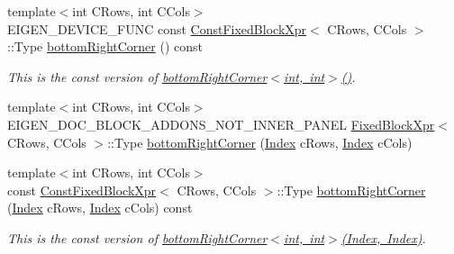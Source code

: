 \begin{DoxyCompactItemize}
{\footnotesize template$<$int C\+Rows, int C\+Cols$>$ }\\E\+I\+G\+E\+N\+\_\+\+D\+E\+V\+I\+C\+E\+\_\+\+F\+U\+NC const \mbox{\hyperlink{struct_eigen_1_1_sparse_matrix_base_1_1_const_fixed_block_xpr}{Const\+Fixed\+Block\+Xpr}}$<$ C\+Rows, C\+Cols $>$\+::Type \mbox{\hyperlink{class_eigen_1_1_sparse_matrix_base_ad511aa3f5b977089238bf0903f8f2267}{bottom\+Right\+Corner}} () const
\begin{DoxyCompactList}\small\item\em This is the const version of \mbox{\hyperlink{class_eigen_1_1_sparse_matrix_base_a3f810c062c1bc3cad4ae82be15c15636}{bottom\+Right\+Corner$<$int, int$>$()}}. \end{DoxyCompactList}\item 
{\footnotesize template$<$int C\+Rows, int C\+Cols$>$ }\\E\+I\+G\+E\+N\+\_\+\+D\+O\+C\+\_\+\+B\+L\+O\+C\+K\+\_\+\+A\+D\+D\+O\+N\+S\+\_\+\+N\+O\+T\+\_\+\+I\+N\+N\+E\+R\+\_\+\+P\+A\+N\+EL \mbox{\hyperlink{struct_eigen_1_1_sparse_matrix_base_1_1_fixed_block_xpr}{Fixed\+Block\+Xpr}}$<$ C\+Rows, C\+Cols $>$\+::Type \mbox{\hyperlink{class_eigen_1_1_sparse_matrix_base_a68d2c2489e2f434ad062384eb224ea85}{bottom\+Right\+Corner}} (\mbox{\hyperlink{struct_eigen_1_1_eigen_base_a554f30542cc2316add4b1ea0a492ff02}{Index}} c\+Rows, \mbox{\hyperlink{struct_eigen_1_1_eigen_base_a554f30542cc2316add4b1ea0a492ff02}{Index}} c\+Cols)
\item 
\mbox{\label{class_eigen_1_1_sparse_matrix_base_a752c59896582b0c654d24362f3799b68}} 
{\footnotesize template$<$int C\+Rows, int C\+Cols$>$ }\\const \mbox{\hyperlink{struct_eigen_1_1_sparse_matrix_base_1_1_const_fixed_block_xpr}{Const\+Fixed\+Block\+Xpr}}$<$ C\+Rows, C\+Cols $>$\+::Type \mbox{\hyperlink{class_eigen_1_1_sparse_matrix_base_a752c59896582b0c654d24362f3799b68}{bottom\+Right\+Corner}} (\mbox{\hyperlink{struct_eigen_1_1_eigen_base_a554f30542cc2316add4b1ea0a492ff02}{Index}} c\+Rows, \mbox{\hyperlink{struct_eigen_1_1_eigen_base_a554f30542cc2316add4b1ea0a492ff02}{Index}} c\+Cols) const
\begin{DoxyCompactList}\small\item\em This is the const version of \mbox{\hyperlink{class_eigen_1_1_sparse_matrix_base_aa531aefed8ea1fa530c638abc8eea6c9}{bottom\+Right\+Corner$<$int, int$>$(\+Index, Index)}}. \end{DoxyCompactList}\item 

\end{DoxyCompactItemize}
